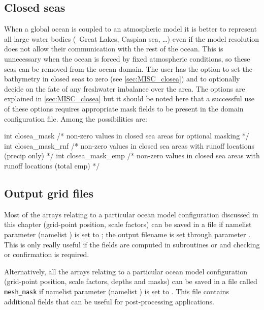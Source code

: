 \documentclass[../main/NEMO_manual]{subfiles}
\begin{document}
\subsection{Closed seas}
\label{subsec:DOM_closea}

When a global ocean is coupled to an atmospheric model it is better to
represent all large water bodies (\eg\ Great Lakes, Caspian sea, \dots) even if
the model resolution does not allow their communication with the rest of the ocean.
This is unnecessary when the ocean is forced by fixed atmospheric conditions,
so these seas can be removed from the ocean domain.
The user has the option to
set the bathymetry in closed seas to zero (see \autoref{sec:MISC_closea}) and to
optionally decide on the fate of any freshwater imbalance over the area.
The options are explained in \autoref{sec:MISC_closea} but
it should be noted here that a successful use of these options requires
appropriate mask fields to be present in the domain configuration file.
Among the possibilities are:

\begin{clines}
int closea_mask     /* non-zero values in closed sea areas for optional masking                */
int closea_mask_rnf /* non-zero values in closed sea areas with runoff locations (precip only) */
int closea_mask_emp /* non-zero values in closed sea areas with runoff locations (total emp)   */
\end{clines}

\subsection{Output grid files}
\label{subsec:DOM_meshmask}

Most of the arrays relating to a particular ocean model configuration discussed in this chapter
(grid-point position, scale factors) can be saved in a file if
namelist parameter  (namelist ) is set to
;
the output filename is set through parameter .
This is only really useful if
the fields are computed in subroutines  or  and
checking or confirmation is required.

Alternatively, all the arrays relating to a particular ocean model configuration
(grid-point position, scale factors, depths and masks) can be saved in
a file called \texttt{mesh\_mask} if
namelist parameter  (namelist ) is set to
.
This file contains additional fields that can be useful for post-processing applications.
\end{document}

